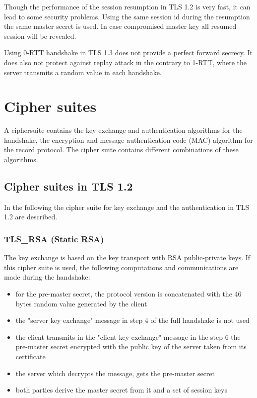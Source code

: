 Though the performance of the session resumption in TLS 1.2 is very fast, it can lead to some security problems. Using the same session id during the resumption the same master secret is used. In case compromised master key all resumed session will be revealed.

Using 0-RTT handshake in TLS 1.3 does not provide a perfect forward secrecy. It does also not protect against replay attack in the contrary to 1-RTT, where the server transmits a random value in each handshake.
\cite{recorla}

\section{Cipher suites}
\label{sec:comparison_ciphersuits}

A ciphersuite contains the key exchange and authentication algorithms for the handshake, the encryption and message authentication code (MAC) algorithm for the record protocol. The cipher suite contains different combinations of these algorithms.

\subsection{Cipher suites in TLS 1.2}
\label{subsec:ciphersuits1_2}

In the following the cipher suite for key exchange and the authentication in TLS 1.2 are described.

\subsubsection*{TLS\_RSA (Static RSA)} 
The key exchange is based on the key transport with RSA public-private keys.
If this cipher suite is used, the following computations and communications are made during the handshake:
\begin{itemize}
	\item for the pre-master secret, the protocol version is concatenated with the 46 bytes random value generated by the client
	\item the "server key exchange" message in step 4 of the full handshake is not used
	\item the client transmits in the "client key exchange" message in the step 6 the pre-master secret encrypted with the public key of the server taken from its certificate
	\item the server which decrypts the message, gets the pre-master secret 
	\item both parties derive the master secret from it and a set of session keys
\end{itemize}

